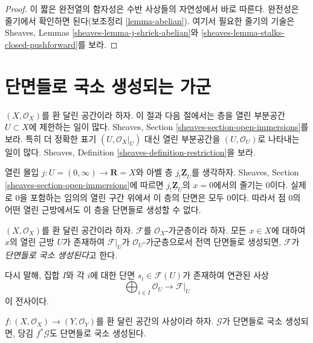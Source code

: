 \begin{proof}
이 짧은 완전열의 함자성은 수반 사상들의 자연성에서 바로 따른다.
완전성은 줄기에서 확인하면 된다(보조정리 \ref{lemma-abelian}).
여기서 필요한 줄기의 기술은 Sheaves, Lemmas
\ref{sheaves-lemma-j-shriek-abelian}와
\ref{sheaves-lemma-stalks-closed-pushforward}를 보라.
\end{proof}








\section{단면들로 국소 생성되는 가군}
\label{section-locally-generated}

\noindent
$(X, \mathcal{O}_X)$를 환 달린 공간이라 하자.
이 절과 다음 절에서는 층을 열린 부분공간 $U \subset X$에
제한하는 일이 많다. Sheaves, Section
\ref{sheaves-section-open-immersions}를 보라.
특히 더 정확한 표기 $(U, \mathcal{O}_X|_U)$ 대신 열린 부분공간을
$(U, \mathcal{O}_U)$로 나타내는 일이 많다. Sheaves, Definition
\ref{sheaves-definition-restriction}을 보라.

\medskip\noindent
열린 몰입
$j : U = (0 , \infty) \to \mathbf{R} = X$와 아벨 층
$j_!\underline{\mathbf{Z}}_U$를 생각하자. Sheaves, Section
\ref{sheaves-section-open-immersions}에 따르면
$j_!\underline{\mathbf{Z}}_U$의 $x = 0$에서의 줄기는 $0$이다.
실제로 $0$을 포함하는 임의의 열린 구간 위에서 이 층의 단면은 모두 $0$이다.
따라서 점 $0$의 어떤 열린 근방에서도 이 층을 단면들로 생성할 수 없다.

\begin{definition}
\label{definition-locally-generated}
$(X, \mathcal{O}_X)$를 환 달린 공간이라 하자.
$\mathcal{F}$를 $\mathcal{O}_X$-가군층이라 하자.
모든 $x \in X$에 대하여 $x$의 열린 근방 $U$가 존재하여
$\mathcal{F}|_U$가 $\mathcal{O}_U$-가군층으로서 전역 단면들로 생성되면,
$\mathcal{F}$가 {\it 단면들로 국소 생성된다}고 한다.
\end{definition}

\noindent
다시 말해, 집합 $I$와 각 $i$에 대한 단면
$s_i \in \mathcal{F}(U)$가 존재하여 연관된 사상
$$
\bigoplus\nolimits_{i \in I} \mathcal{O}_U
\longrightarrow
\mathcal{F}|_U
$$
이 전사이다.

\begin{lemma}
\label{lemma-pullback-locally-generated}
$f : (X, \mathcal{O}_X) \to (Y, \mathcal{O}_Y)$를
환 달린 공간의 사상이라 하자.
$\mathcal{G}$가 단면들로 국소 생성되면, 당김 $f^*\mathcal{G}$도
단면들로 국소 생성된다.
\end{lemma}

